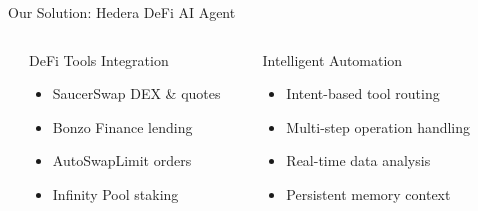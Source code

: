 \documentclass[aspectratio=169]{beamer}
\providecommand{\faShieldAlt}{\faLock}
\begin{document}
\begin{frame}{Our Solution: Hedera DeFi AI Agent}
\begin{columns}[c]
\begin{center}
\end{center}

\vspace{0.05cm}

\begin{block}{DeFi Tools Integration}
\vspace{0.05cm}
\begin{itemize}
\setlength\itemsep{-0.1em}
\setlength\leftmargin{1em}
\item[\color{success}\faCheckCircle] SaucerSwap DEX \& quotes
\item[\color{success}\faCheckCircle] Bonzo Finance lending
\item[\color{success}\faCheckCircle] AutoSwapLimit orders
\item[\color{success}\faCheckCircle] Infinity Pool staking
\end{itemize}
\vspace{0.05cm}
\end{block}

\begin{center}
\end{center}

\vspace{0.05cm}

\begin{block}{Intelligent Automation}
\vspace{0.05cm}
\begin{itemize}
\setlength\itemsep{-0.1em}
\setlength\leftmargin{1em}
\item[\color{primary}\faLock] Intent-based tool routing
\item[\color{primary}\faSignature] Multi-step operation handling
\item[\color{primary}\faChartPie] Real-time data analysis
\item[\color{primary}\faUserShield] Persistent memory context
\end{itemize}
\vspace{0.05cm}
\end{block}
\end{columns}
\end{frame}
\end{document}

